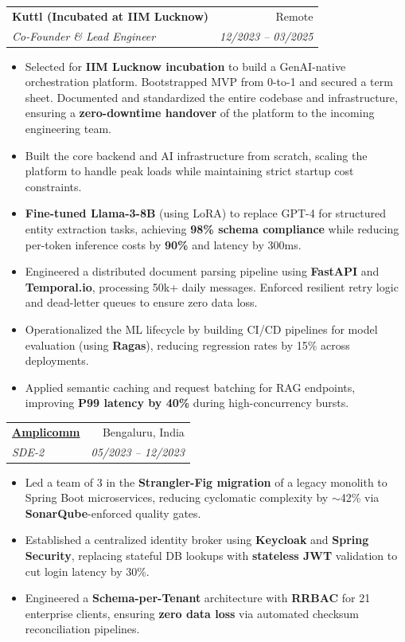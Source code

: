 \documentclass[11pt,a4paper]{article}
\makeatletter
\newcommand{\resumeItem}[1]{
  \item\small{
    {#1 \vspace{-2pt}}
  }
}
\newcommand{\resumeSubheading}[4]{
  \vspace{-1pt}\item
    \begin{tabular*}{0.97\textwidth}[t]{l@{\extracolsep{\fill}}r}
      \textbf{#1} & #2 \\
      \textit{\small#3} & \textit{\small #4} \\
    \end{tabular*}\vspace{-5pt}
}
\newcommand{\resumeItemListStart}{\begin{itemize}[itemsep=2pt, topsep=0pt, partopsep=0pt]}
\newcommand{\resumeItemListEnd}{\end{itemize}\vspace{-5pt}}
\makeatother
\begin{document}
    \resumeSubheading
      {Kuttl (Incubated at IIM Lucknow)}{Remote}
      {Co-Founder \& Lead Engineer}{12/2023 -- 03/2025}
      \resumeItemListStart
        \resumeItem{Selected for \textbf{IIM Lucknow incubation} to build a GenAI-native orchestration platform. Bootstrapped MVP from 0-to-1 and secured a term sheet. Documented and standardized the entire codebase and infrastructure, ensuring a \textbf{zero-downtime handover} of the platform to the incoming engineering team.}
        \resumeItem{Built the core backend and AI infrastructure from scratch, scaling the platform to handle peak loads while maintaining strict startup cost constraints.}
        \resumeItem{\textbf{Fine-tuned Llama-3-8B} (using LoRA) to replace GPT-4 for structured entity extraction tasks, achieving \textbf{98\% schema compliance} while reducing per-token inference costs by \textbf{90\%} and latency by 300ms.}
        \resumeItem{Engineered a distributed document parsing pipeline using \textbf{FastAPI} and \textbf{Temporal.io}, processing 50k+ daily messages. Enforced resilient retry logic and dead-letter queues to ensure zero data loss.}
        \resumeItem{Operationalized the ML lifecycle by building CI/CD pipelines for model evaluation (using \textbf{Ragas}), reducing regression rates by 15\% across deployments.}
        \resumeItem{Applied semantic caching and request batching for RAG endpoints, improving \textbf{P99 latency by 40\%} during high-concurrency bursts.}
      \resumeItemListEnd

    \resumeSubheading
      {\href{https://amplicomm.com/}{Amplicomm}}{Bengaluru, India}
      {SDE-2}{05/2023 -- 12/2023}
      \resumeItemListStart
        \resumeItem{Led a team of 3 in the \textbf{Strangler-Fig migration} of a legacy monolith to Spring Boot microservices, reducing cyclomatic complexity by $\sim$42\% via \textbf{SonarQube}-enforced quality gates.}
        \resumeItem{Established a centralized identity broker using \textbf{Keycloak} and \textbf{Spring Security}, replacing stateful DB lookups with \textbf{stateless JWT} validation to cut login latency by 30\%.}
        \resumeItem{Engineered a \textbf{Schema-per-Tenant} architecture with \textbf{RRBAC} for 21 enterprise clients, ensuring \textbf{zero data loss} via automated checksum reconciliation pipelines.}
      \resumeItemListEnd
\end{document}
